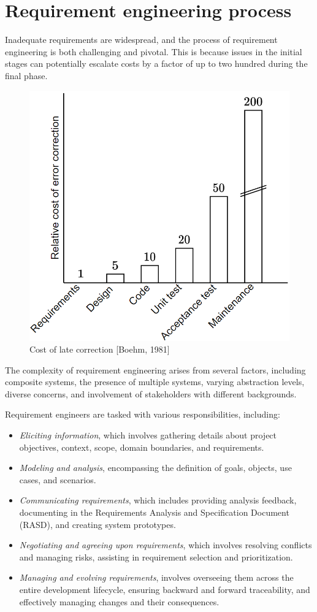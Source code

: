 \section{Requirement engineering process}

Inadequate requirements are widespread, and the process of requirement engineering is both challenging and pivotal. 
This is because issues in the initial stages can potentially escalate costs by a factor of up to two hundred during the final phase.
\begin{figure}[H]
    \centering
    \includegraphics[width=0.35\linewidth]{images/requirements.png}
    \caption{Cost of late correction [Boehm, 1981]}
\end{figure}
The complexity of requirement engineering arises from several factors, including composite systems, the presence of multiple systems, varying abstraction levels, diverse concerns, and involvement of stakeholders with different backgrounds.

Requirement engineers are tasked with various responsibilities, including:
\begin{itemize}
    \item \textit{Eliciting information}, which involves gathering details about project objectives, context, scope, domain boundaries, and requirements.
    \item \textit{Modeling and analysis}, encompassing the definition of goals, objects, use cases, and scenarios.
    \item \textit{Communicating requirements}, which includes providing analysis feedback, documenting in the Requirements Analysis and Specification Document (RASD), and creating system prototypes.
    \item \textit{Negotiating and agreeing upon requirements}, which involves resolving conflicts and managing risks, assisting in requirement selection and prioritization.
    \item \textit{Managing and evolving requirements}, involves overseeing them across the entire development lifecycle, ensuring backward and forward traceability, and effectively managing changes and their consequences.
\end{itemize}